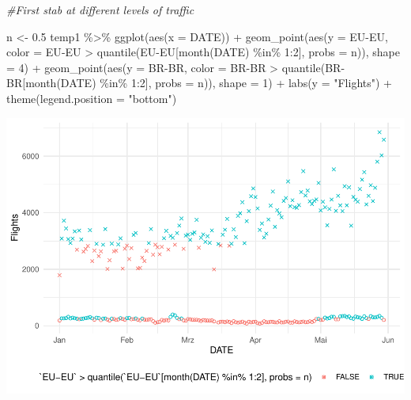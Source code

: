 \documentclass[conference,final,]{IEEEtran}
\makeatletter
\def\maxwidth{\ifdim\Gin@nat@width>\linewidth\linewidth
\else\Gin@nat@width\fi}
\let\Oldincludegraphics\includegraphics
\renewcommand{\includegraphics}[1]{\Oldincludegraphics[width=\maxwidth]{#1}}
\newenvironment{Shaded}{\begin{snugshade}}{\end{snugshade}}
\newcommand{\AttributeTok}[1]{\textcolor[rgb]{0.77,0.63,0.00}{#1}}
\newcommand{\CommentTok}[1]{\textcolor[rgb]{0.56,0.35,0.01}{\textit{#1}}}
\newcommand{\DecValTok}[1]{\textcolor[rgb]{0.00,0.00,0.81}{#1}}
\newcommand{\FloatTok}[1]{\textcolor[rgb]{0.00,0.00,0.81}{#1}}
\newcommand{\FunctionTok}[1]{\textcolor[rgb]{0.00,0.00,0.00}{#1}}
\newcommand{\NormalTok}[1]{#1}
\newcommand{\OtherTok}[1]{\textcolor[rgb]{0.56,0.35,0.01}{#1}}
\newcommand{\SpecialCharTok}[1]{\textcolor[rgb]{0.00,0.00,0.00}{#1}}
\newcommand{\StringTok}[1]{\textcolor[rgb]{0.31,0.60,0.02}{#1}}
\makeatother
\begin{document}
\begin{Shaded}
\begin{Highlighting}[]
\CommentTok{\#First stab at different levels of traffic}

\NormalTok{n }\OtherTok{\textless{}{-}} \FloatTok{0.5}
\NormalTok{temp1 }\SpecialCharTok{\%\textgreater{}\%} \FunctionTok{ggplot}\NormalTok{(}\FunctionTok{aes}\NormalTok{(}\AttributeTok{x =}\NormalTok{ DATE)) }\SpecialCharTok{+}
  \FunctionTok{geom\_point}\NormalTok{(}\FunctionTok{aes}\NormalTok{(}\AttributeTok{y =} \StringTok{\textasciigrave{}}\AttributeTok{EU{-}EU}\StringTok{\textasciigrave{}}\NormalTok{, }\AttributeTok{color =} \StringTok{\textasciigrave{}}\AttributeTok{EU{-}EU}\StringTok{\textasciigrave{}} \SpecialCharTok{\textgreater{}} \FunctionTok{quantile}\NormalTok{(}\StringTok{\textasciigrave{}}\AttributeTok{EU{-}EU}\StringTok{\textasciigrave{}}\NormalTok{[}\FunctionTok{month}\NormalTok{(DATE) }\SpecialCharTok{\%in\%} \DecValTok{1}\SpecialCharTok{:}\DecValTok{2}\NormalTok{], }\AttributeTok{probs =}\NormalTok{ n)), }\AttributeTok{shape =} \DecValTok{4}\NormalTok{) }\SpecialCharTok{+}
  \FunctionTok{geom\_point}\NormalTok{(}\FunctionTok{aes}\NormalTok{(}\AttributeTok{y =} \StringTok{\textasciigrave{}}\AttributeTok{BR{-}BR}\StringTok{\textasciigrave{}}\NormalTok{, }\AttributeTok{color =} \StringTok{\textasciigrave{}}\AttributeTok{BR{-}BR}\StringTok{\textasciigrave{}} \SpecialCharTok{\textgreater{}} \FunctionTok{quantile}\NormalTok{(}\StringTok{\textasciigrave{}}\AttributeTok{BR{-}BR}\StringTok{\textasciigrave{}}\NormalTok{[}\FunctionTok{month}\NormalTok{(DATE) }\SpecialCharTok{\%in\%} \DecValTok{1}\SpecialCharTok{:}\DecValTok{2}\NormalTok{], }\AttributeTok{probs =}\NormalTok{ n)), }\AttributeTok{shape =} \DecValTok{1}\NormalTok{) }\SpecialCharTok{+}
  \FunctionTok{labs}\NormalTok{(}\AttributeTok{y  =} \StringTok{"Flights"}\NormalTok{) }\SpecialCharTok{+} 
  \FunctionTok{theme}\NormalTok{(}\AttributeTok{legend.position =} \StringTok{"bottom"}\NormalTok{)}
\end{Highlighting}
\end{Shaded}

\includegraphics{paper_files/figure-latex/unnamed-chunk-6-1.pdf}
\end{document}
